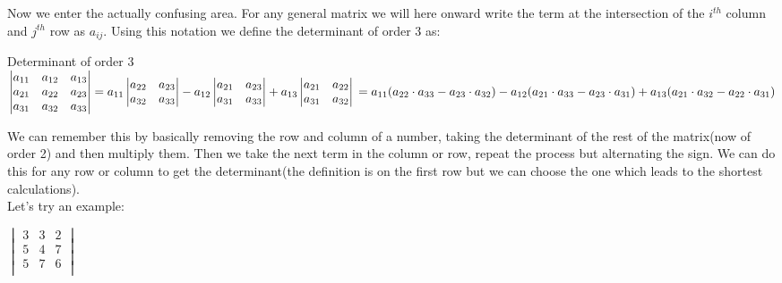 Now we enter the actually confusing area.  For any general matrix we will here onward write the term at the intersection of the $i^{th}$ column and $j^{th}$ row as $a_{ij}$. Using this notation we define the determinant of order 3 as:\\
\begin{definition}
    Determinant of order 3
    $\begin{vmatrix}
    a_{11} & a_{12} & a_{13} \\
    a_{21} & a_{22} & a_{23} \\
    a_{31} & a_{32} & a_{33} \\
\end{vmatrix} = a_{11} \begin{vmatrix}
    a_{22} & a_{23}\\
    a_{32} & a_{33}\\
\end{vmatrix} - a_{12} \begin{vmatrix}
    a_{21} & a_{23}\\
    a_{31} & a_{33}\\
\end{vmatrix} + a_{13} \begin{vmatrix}
    a_{21} & a_{22}\\
    a_{31} & a_{32}\\
\end{vmatrix}\\
= a_{11}(a_{22}\cdot a_{33} - a_{23}\cdot a_{32})-a_{12}(a_{21}\cdot a_{33} - a_{23}\cdot a_{31})+ a_{13}(a_{21}\cdot a_{32} - a_{22}\cdot a_{31})$ 
\end{definition}
We can remember this by basically removing the row and column of a number, taking the determinant of the rest of the matrix(now of order 2) and then multiply them. Then we take the next term in the column or row, repeat the process but alternating the sign. We can do this for any row or column to get the determinant(the definition is on the first row but we can choose the one which leads to the shortest calculations).\\
Let's try an example:\\
\begin{example}
    $\begin{vmatrix}
    3 & 3 & 2 \\
    5 & 4 & 7 \\
    5 & 7 & 6 \\
\end{vmatrix}$
\end{example}

